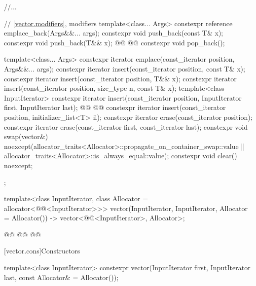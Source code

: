 \documentclass{wg21}
\begin{document}
\begin{codeblock}
{{        //...

         // \ref{vector.modifiers}, modifiers
        template<class... Args> constexpr reference emplace_back(Args&&... args);
        constexpr void push_back(const T& x);
        constexpr void push_back(T&& x);
        @@
        @@
        constexpr void pop_back();

        template<class... Args> constexpr iterator emplace(const_iterator position, Args&&... args);
        constexpr iterator insert(const_iterator position, const T& x);
        constexpr iterator insert(const_iterator position, T&& x);
        constexpr iterator insert(const_iterator position, size_type n, const T& x);
        template<class InputIterator>
        constexpr iterator insert(const_iterator position, InputIterator first, InputIterator last);
        @@
        @@
        constexpr iterator insert(const_iterator position, initializer_list<T> il);
        constexpr iterator erase(const_iterator position);
        constexpr iterator erase(const_iterator first, const_iterator last);
        constexpr void     swap(vector&)
        noexcept(allocator_traits<Allocator>::propagate_on_container_swap::value ||
        allocator_traits<Allocator>::is_always_equal::value);
        constexpr void     clear() noexcept;
    };

    template<class InputIterator, class Allocator = allocator<@@<InputIterator>>>
    vector(InputIterator, InputIterator, Allocator = Allocator())
    -> vector<@@<InputIterator>, Allocator>;

    @@
    @@
    @@
}
\end{codeblock}%
[vector.cons]{Constructors}


\begin{itemdecl}
    template<class InputIterator>
    constexpr vector(InputIterator first, InputIterator last,
    const Allocator& = Allocator());
\end{itemdecl}
\end{document}
